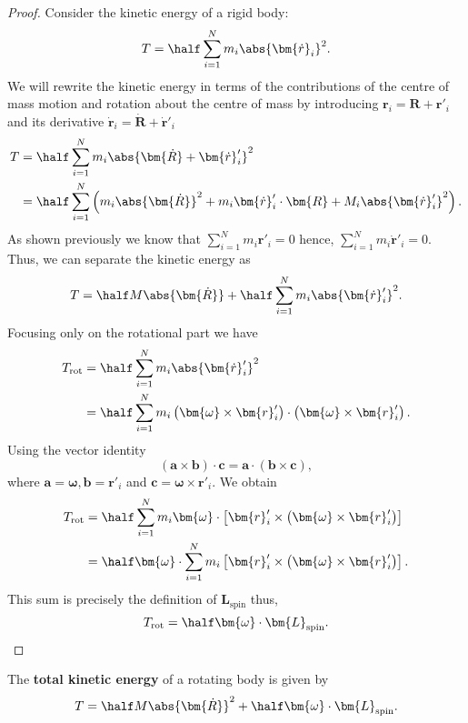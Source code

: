 \documentclass[12pt, a4paper]{article}
\begin{document}
\begin{proof}
    Consider the kinetic energy of a rigid body: 
    \[T =\half \sum_{i=1}^{N} m_i \abs{\bm{\dot{r}}_i}^2.\]
    We will rewrite the kinetic energy in terms of the contributions of the centre of mass motion and rotation about the centre of mass by introducing \(\bm{r}_i = \bm{R}+\bm{r}'_i\) and its derivative \(\bm{\dot{r}}_i = \bm{\dot{R}}+\bm{\dot{r}}'_i\)
    \[\begin{aligned}
        T &= \half \sum_{i=1}^{N} m_i \abs{\bm{\dot{R}} +\bm{\dot{r}}'_i}^2 \\
        &= \half \sum_{i=1}^{N} \left( m_i \abs{\bm{\dot{R}}}^2 + m_i \bm{\dot{r}}'_i \cdot \bm{R} + M_i \abs{\bm{\dot{r}}'_i}^2 \right).
    \end{aligned}\]
    As shown previously we know that \(\sum_{i=1}^{N} m_i \bm{r}'_i =0\) hence, \(\sum_{i=1}^{N} m_i \bm{\dot{r}}'_i=0\). Thus, we can separate the kinetic energy as 
    \[T = \half M \abs{\bm{\dot{R}}} + \half \sum_{i=1}^{N} m_i \abs{\bm{\dot{r}}'_i}^2.\]
    Focusing only on the rotational part we have 
    \[\begin{aligned}
        T_{\text{rot}} &= \half \sum_{i=1}^{N} m_i  \abs{\bm{\dot{r}}'_i}^2 \\
        &= \half \sum_{i=1}^{N} m_i \left( \bm{\omega} \times \bm{r}'_i \right) \cdot \left( \bm{\omega} \times \bm{r}'_i \right).
    \end{aligned}\]
    Using the vector identity 
    \[(\bm{a} \times \bm{b}) \cdot \bm{c} = \bm{a} \cdot \left( \bm{b}\times \bm{c} \right),\]
    where \(\bm{a} = \bm{\omega}, \bm{b}=\bm{r}'_i\) and \(\bm{c}=\bm{\omega} \times \bm{r}'_i\). We obtain 
    \[\begin{aligned}
        T_{\text{rot}} &= \half \sum_{i=1}^{N} m_i \bm{\omega} \cdot \left[ \bm{r}'_i \times \left( \bm{\omega} \times \bm{r}'_i \right) \right] \\
        &= \half \bm{\omega} \cdot \sum_{i=1}^{N} m_i \left[ \bm{r}'_i \times \left( \bm{\omega} \times \bm{r}'_i \right)\right].
    \end{aligned}\]
    This sum is precisely the definition of \(\bm{L}_{\text{spin}}\) thus,
    \[T_{\text{rot}} = \half \bm{\omega} \cdot \bm{L}_{\text{spin}}.\]
\end{proof}

\begin{mdthm}
    The \textbf{total kinetic energy} of a rotating body is given by 
    \[T = \half M \abs{\bm{\dot{R}}}^2 +\half \bm{\omega} \cdot \bm{L}_{\text{spin}}.\]
\end{mdthm}
\end{document}
